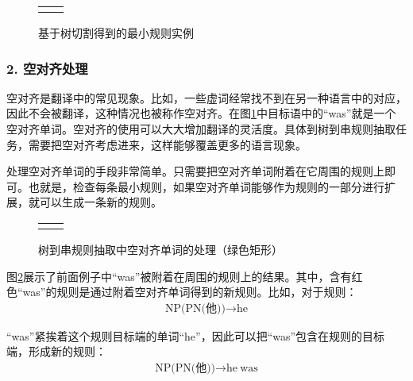 \begin{figure}[htp]
\centering
\begin{tabular}{l l}
\subfigure{} &  \subfigure{}
\end{tabular}
\caption{基于树切割得到的最小规则实例}
\label{fig:8-27}
\end{figure}

\subsubsection{2. 空对齐处理}

\parinterval 空对齐是翻译中的常见现象。比如，一些虚词经常找不到在另一种语言中的对应，因此不会被翻译，这种情况也被称作空对齐。在图\ref{fig:8-27}中目标语中的“was”就是一个空对齐单词。空对齐的使用可以大大增加翻译的灵活度。具体到树到串规则抽取任务，需要把空对齐考虑进来，这样能够覆盖更多的语言现象。

\parinterval 处理空对齐单词的手段非常简单。只需要把空对齐单词附着在它周围的规则上即可。也就是，检查每条最小规则，如果空对齐单词能够作为规则的一部分进行扩展，就可以生成一条新的规则。

\begin{figure}[htp]
\centering
\begin{tabular}{l l}
\subfigure{} &  \subfigure{}
\end{tabular}
\caption{树到串规则抽取中空对齐单词的处理（绿色矩形）}
\label{fig:8-28}
\end{figure}

\parinterval 图\ref{fig:8-28}展示了前面例子中“was”被附着在周围的规则上的结果。其中，含有红色“was”的规则是通过附着空对齐单词得到的新规则。比如，对于规则：
\begin{eqnarray}
\textrm{NP(PN(他))} \rightarrow \textrm{he} \nonumber
\end{eqnarray}

\parinterval “was”紧挨着这个规则目标端的单词“he”，因此可以把“was”包含在规则的目标端，形成新的规则：
\begin{eqnarray}
\textrm{NP(PN(他))} \rightarrow \textrm{he}\ \textrm{was} \nonumber
\end{eqnarray}

